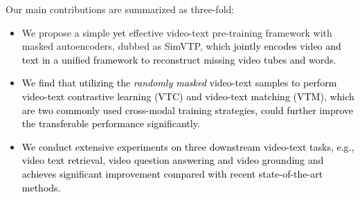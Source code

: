 \documentclass[10pt,twocolumn,letterpaper]{article}
\newcommand{\yty}[1]{\textcolor{black}{#1}}
\begin{document}
Our main contributions are summarized as three-fold:
\begin{itemize}
	\item 
	We propose a simple \yty{yet} effective video-text pre-training framework with masked autoencoders,  dubbed as SimVTP, which \yty{jointly encodes video and text in a unified framework to reconstruct missing video tubes and words.}

	\item 
	\yty{We find that utilizing the \textit{randomly masked }video-text samples to perform video-text contrastive learning (VTC) and video-text matching (VTM), which are two commonly used cross-modal training strategies, could further improve the transferable performance significantly. }
	
	\item 
	\yty{We conduct extensive experiments on three downstream video-text tasks, e.g., video text retrieval, video question answering and video grounding and achieves significant improvement compared with recent state-of-the-art methods. }
	

\end{itemize}
\end{document}
